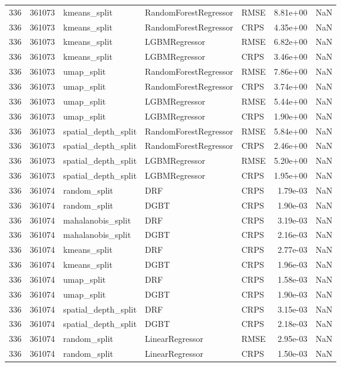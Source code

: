 \begin{tabular}{rrlllrr}
336 & 361073 & kmeans\_split & RandomForestRegressor & RMSE & 8.81e+00 & NaN \\
336 & 361073 & kmeans\_split & RandomForestRegressor & CRPS & 4.35e+00 & NaN \\
336 & 361073 & kmeans\_split & LGBMRegressor & RMSE & 6.82e+00 & NaN \\
336 & 361073 & kmeans\_split & LGBMRegressor & CRPS & 3.46e+00 & NaN \\
336 & 361073 & umap\_split & RandomForestRegressor & RMSE & 7.86e+00 & NaN \\
336 & 361073 & umap\_split & RandomForestRegressor & CRPS & 3.74e+00 & NaN \\
336 & 361073 & umap\_split & LGBMRegressor & RMSE & 5.44e+00 & NaN \\
336 & 361073 & umap\_split & LGBMRegressor & CRPS & 1.90e+00 & NaN \\
336 & 361073 & spatial\_depth\_split & RandomForestRegressor & RMSE & 5.84e+00 & NaN \\
336 & 361073 & spatial\_depth\_split & RandomForestRegressor & CRPS & 2.46e+00 & NaN \\
336 & 361073 & spatial\_depth\_split & LGBMRegressor & RMSE & 5.20e+00 & NaN \\
336 & 361073 & spatial\_depth\_split & LGBMRegressor & CRPS & 1.95e+00 & NaN \\
336 & 361074 & random\_split & DRF & CRPS & 1.79e-03 & NaN \\
336 & 361074 & random\_split & DGBT & CRPS & 1.90e-03 & NaN \\
336 & 361074 & mahalanobis\_split & DRF & CRPS & 3.19e-03 & NaN \\
336 & 361074 & mahalanobis\_split & DGBT & CRPS & 2.16e-03 & NaN \\
336 & 361074 & kmeans\_split & DRF & CRPS & 2.77e-03 & NaN \\
336 & 361074 & kmeans\_split & DGBT & CRPS & 1.96e-03 & NaN \\
336 & 361074 & umap\_split & DRF & CRPS & 1.58e-03 & NaN \\
336 & 361074 & umap\_split & DGBT & CRPS & 1.90e-03 & NaN \\
336 & 361074 & spatial\_depth\_split & DRF & CRPS & 3.15e-03 & NaN \\
336 & 361074 & spatial\_depth\_split & DGBT & CRPS & 2.18e-03 & NaN \\
336 & 361074 & random\_split & LinearRegressor & RMSE & 2.95e-03 & NaN \\
336 & 361074 & random\_split & LinearRegressor & CRPS & 1.50e-03 & NaN \\

\end{tabular}
